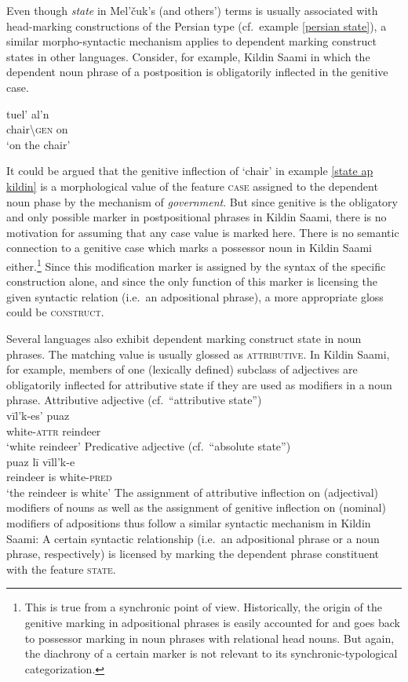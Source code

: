 Even though \emph{state} in Mel'čuk's (and others') terms is usually associated with head-marking constructions of the Persian type (cf.~example \ref{persian state}), a similar morpho-syntactic mechanism applies to dependent marking construct states in other languages. Consider, for example, Kildin Saami in which the dependent noun phrase of a postposition is obligatorily inflected in the genitive case.
\begin{exe}
\label{state ap kildin}
\gll 	tuel'		al'n\\
	chair\textbackslash\textsc{gen}	on\\
\glt 	‘on the chair’
\end{exe}
It could be argued that the genitive inflection of ‘chair’ in example \ref{state ap kildin} is a morphological value of the feature \textsc{case} assigned to the dependent noun phase by the mechanism of \emph{government}. But since genitive is the obligatory and only possible marker in postpositional phrases in Kildin Saami, there is no motivation for assuming that any case value is marked here. There is no semantic connection to a genitive case which marks a possessor noun in Kildin Saami either.\footnote{This is true from a synchronic point of view. Historically, the origin of the genitive marking in adpositional phrases is easily accounted for and goes back to possessor marking in noun phrases with relational head nouns. But again, the diachrony of a certain marker is not relevant to its synchronic-typological categorization.} Since this modification marker is assigned by the syntax of the specific construction alone, and since the only function of this marker is licensing the given syntactic relation (i.e.~an adpositional phrase), a more appropriate gloss could be \textsc{construct}.

Several languages also exhibit dependent marking construct state in noun phrases. The matching value is usually glossed as \textsc{attributive}. In Kildin Saami, for example, members of one (lexically defined) subclass of adjectives are obligatorily inflected for attributive state if they are used as modifiers in a noun phrase.
\label{state np kildin}
\ex	Attributive adjective (cf.~“attributive state”)\\
\gll 	vīl'k-es'		puaz\\
	white-\textsc{attr}	reindeer\\
\glt 	‘white reindeer’
\ex	Predicative adjective (cf.~“absolute state”)\\
\gll	puaz lī vīll'k-e\\
	reindeer is white-\textsc{pred}\\
\glt	‘the reindeer is white’
\zl
The assignment of attributive inflection on (adjectival) modifiers of nouns as well as the assignment of genitive inflection on (nominal) modifiers of adpositions thus follow a similar syntactic mechanism in Kildin Saami: A certain syntactic relationship (i.e.~an adpositional phrase or a noun phrase, respectively) is licensed by marking the dependent phrase constituent with the feature \textsc{state}.

